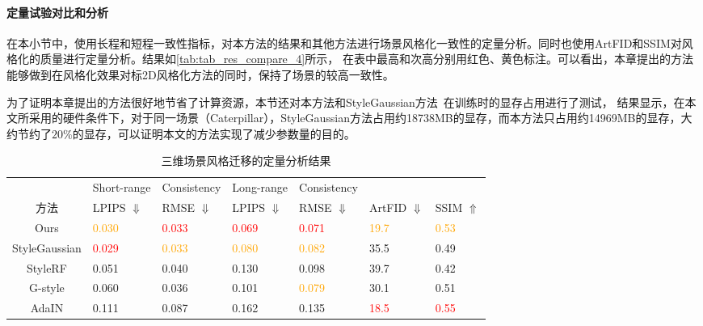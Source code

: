 \paragraph{定量试验对比和分析}
在本小节中，使用长程和短程一致性指标，对本方法的结果和其他方法进行场景风格化一致性的定量分析。同时也使用ArtFID和SSIM对风格化的质量进行定量分析。结果如\autoref{tab:tab_res_compare_4}所示，
在表中最高和次高分别用红色、黄色标注。可以看出，本章提出的方法能够做到在风格化效果对标2D风格化方法的同时，保持了场景的较高一致性。
\par 为了证明本章提出的方法很好地节省了计算资源，本节还对本方法和StyleGaussian方法~\cite{liu2024stylegaussian}在训练时的显存占用进行了测试，
结果显示，在本文所采用的硬件条件下，对于同一场景（Caterpillar），StyleGaussian方法占用约18738MB的显存，而本方法只占用约14969MB的显存，大约节约了$20\%$的显存，可以证明本文的方法实现了减少参数量的目的。
\begin{table}[htb]
    \centering
    \caption{三维场景风格迁移的定量分析结果}
    \label{tab:tab_res_compare_4}
    \begin{tabularx}{\textwidth}{c X<{\centering} X<{\centering} X<{\centering} X<{\centering} X<{\centering}  X<{\centering} }
        \hline
         & Short-range        & Consistency       & Long-range          & Consistency        &  &  \\
         方法   & LPIPS $\Downarrow$ &  RMSE $\Downarrow$ &  LPIPS $\Downarrow$&  RMSE $\Downarrow$ &       ArtFID $\Downarrow$ & SSIM $\Uparrow$  \\ \hline
        Ours & \textcolor{orange}{0.030}        & \textcolor{red}{0.033} & \textcolor{red}{0.069}   & \textcolor{red}{0.071} & \textcolor{orange}{19.7} & \textcolor{orange}{0.53}   \\ 
        StyleGaussian & \textcolor{red}{0.029} & \textcolor{orange}{0.033} & \textcolor{orange}{0.080} & \textcolor{orange}{0.082} &  35.5  & 0.49  \\ 
        StyleRF & 0.051            & 0.040            & 0.130            & 0.098            &    39.7        &  0.42 \\ 
        G-style & 0.060           & 0.036        & 0.101            &  \textcolor{orange}{0.079} &  30.1          &0.51 \\ 
        AdaIN & 0.111   & 0.087         & 0.162             & 0.135          & \textcolor{red}{18.5}        & \textcolor{red}{0.55} \\ \hline
    \end{tabularx}
\end{table}
